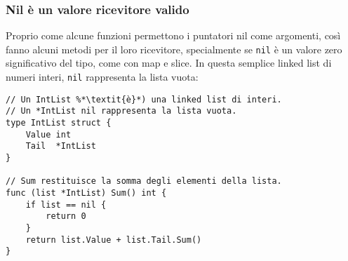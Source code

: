 \documentclass[../../thesis.tex]{subfiles}
\begin{document}
    \subsubsection{Nil è un valore ricevitore valido}
    Proprio come alcune funzioni permettono i puntatori nil come argomenti, così fanno alcuni metodi per il loro ricevitore, specialmente se \verb"nil" è un valore zero significativo del tipo, come con map e slice.
    In questa semplice linked list di numeri interi, \verb"nil" rappresenta la lista vuota:
    \begin{lstlisting}[frame = single,label={lst:lstlisting5-2.8}]
// Un IntList %*\textit{è}*) una linked list di interi.
// Un *IntList nil rappresenta la lista vuota.
type IntList struct {
    Value int
    Tail  *IntList
}

// Sum restituisce la somma degli elementi della lista.
func (list *IntList) Sum() int {
    if list == nil {
        return 0
    }
    return list.Value + list.Tail.Sum()
}
    \end{lstlisting}
\end{document}
